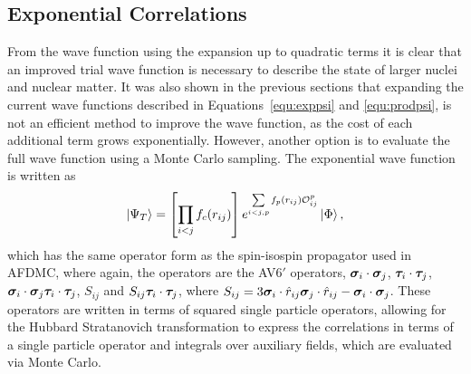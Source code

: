 \subsection{Exponential Correlations}
From the wave function using the expansion up to quadratic terms it is clear that an improved trial wave function is necessary to describe the state of larger nuclei and nuclear matter. It was also shown in the previous sections that expanding the current wave functions described in Equations~\ref{equ:exppsi} and \ref{equ:prodpsi}, is not an efficient method to improve the wave function, as the cost of each additional term grows exponentially. However, another option is to evaluate the full wave function using a Monte Carlo sampling. The exponential wave function is written as
\begin{equation}
   \left| \Psi_T \right> = \left[\prod\limits_{i<j}f_c(r_{ij})\right] e^{\sum\limits_{i<j,p}f_p(r_{ij})\mathcal{O}^p_{ij}} \left| \Phi \right>,
\end{equation}
which has the same operator form as the spin-isospin propagator used in AFDMC, where again, the operators are the AV6$'$ operators, $\bm{\sigma}_i\cdot\bm{\sigma}_j$, $\bm{\tau}_i\cdot\bm{\tau}_j$, $\bm{\sigma}_i\cdot\bm{\sigma}_j \bm{\tau}_i\cdot\bm{\tau}_j$, $S_{ij}$ and $S_{ij} \bm{\tau}_i\cdot\bm{\tau}_j$, where $S_{ij} = 3\bm{\sigma}_i\cdot\hat{r}_{ij}\bm{\sigma}_j\cdot\hat{r}_{ij}-\bm{\sigma}_i\cdot\bm{\sigma}_j$. These operators are written in terms of squared single particle operators, allowing for the Hubbard Stratanovich transformation to express the correlations in terms of a single particle operator and integrals over auxiliary fields, which are evaluated via Monte Carlo.


